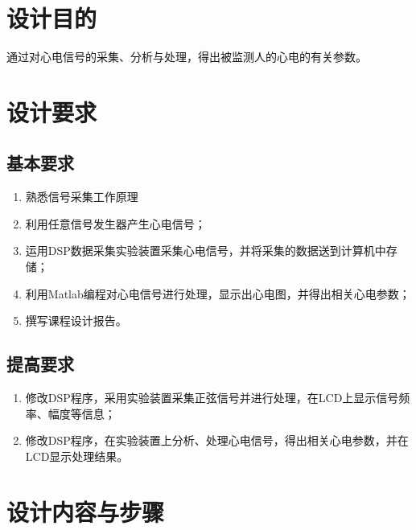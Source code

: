 \documentclass[12pt]{article}
\begin{document}
\section{设计目的}
\setcounter{table}{0}\setcounter{figure}{0}\setcounter{equation}{0}
通过对心电信号的采集、分析与处理，得出被监测人的心电的有关参数。
\section{设计要求}
\setcounter{table}{0}\setcounter{figure}{0}\setcounter{equation}{0}
\subsection{基本要求}
\begin{enumerate}
 \item  熟悉信号采集工作原理
  \item 利用任意信号发生器产生心电信号；
\item 运用DSP数据采集实验装置采集心电信号，并将采集的数据送到计算机中存储；
\item 利用Matlab编程对心电信号进行处理，显示出心电图，并得出相关心电参数；
\item 撰写课程设计报告。
\end{enumerate}
\subsection{提高要求}
\begin{enumerate}
  \item 修改DSP程序，采用实验装置采集正弦信号并进行处理，在LCD上显示信号频率、幅度等信息；
  \item 修改DSP程序，在实验装置上分析、处理心电信号，得出相关心电参数，并在LCD显示处理结果。
\end{enumerate}
\section{设计内容与步骤}
\setcounter{table}{0}\setcounter{figure}{0}\setcounter{equation}{0}
\end{document}
